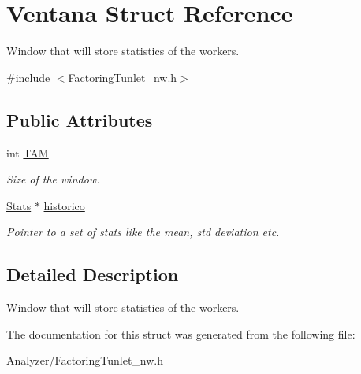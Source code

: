 \hypertarget{struct_ventana}{\section{Ventana Struct Reference}
\label{struct_ventana}
}


Window that will store statistics of the workers.  




{\ttfamily \#include $<$Factoring\-Tunlet\-\_\-nw.\-h$>$}

\subsection*{Public Attributes}
\begin{DoxyCompactItemize}
\item 
\hypertarget{struct_ventana_ad1888a6657f2dea82292e82af781999d}{int \hyperlink{struct_ventana_ad1888a6657f2dea82292e82af781999d}{T\-A\-M}}\label{struct_ventana_ad1888a6657f2dea82292e82af781999d}

\begin{DoxyCompactList}\small\item\em Size of the window. \end{DoxyCompactList}\item 
\hypertarget{struct_ventana_a4a143a9ffb768156a7ad0e58d553ae3f}{\hyperlink{struct_stats}{Stats} $\ast$ \hyperlink{struct_ventana_a4a143a9ffb768156a7ad0e58d553ae3f}{historico}}\label{struct_ventana_a4a143a9ffb768156a7ad0e58d553ae3f}

\begin{DoxyCompactList}\small\item\em Pointer to a set of stats like the mean, std deviation etc. \end{DoxyCompactList}\end{DoxyCompactItemize}


\subsection{Detailed Description}
Window that will store statistics of the workers. 

The documentation for this struct was generated from the following file\-:\begin{DoxyCompactItemize}
\item 
Analyzer/Factoring\-Tunlet\-\_\-nw.\-h\end{DoxyCompactItemize}
